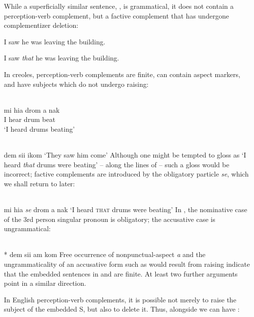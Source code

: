 \z

\z

\z
While a superficially similar sentence, , is grammatical, it does not contain a perception-verb complement, but a factive complement that has undergone complementizer deletion:

\ea\label{ex:2:130}I saw he was leaving the building.\z

\ea\label{ex:2:131}I saw \textit{that} he was leaving the building.\z

In creoles, perception-verb complements are finite, can contain aspect markers, and have subjects which do not undergo raising:

\ea\label{ex:2:132}
\langinfo{\langGC}{}{}\\
\gll mi hia drom a nak\\
I hear drum {\ASP} beat\\
\glt `I heard drums beating'
\z

\ea\label{ex:2:133}
\langinfo{\langGC}{}{}\\
dem sii ikom
\glt `They saw him come'
\z
Although one might be tempted to gloss  as `I heard \textit{that} drums were beating' -- along the lines of  -- such a gloss would be incorrect; factive complements are introduced by the obligatory particle \textit{se}, which we shall return to later:

\ea\label{ex:2:134}
\langinfo{\langGC}{}{}\\
mi hia \textit{se} drom a nak
\glt `I heard {\scshape that} drums were beating'
\z
In , the nominative case of the 3rd person singular pronoun is obligatory; the accusative case is ungrammatical:

\ea\label{ex:2:135}
\langinfo{\langGC}{}{}\\
\textnormal{*} dem sii am kom
\z
Free occurrence of nonpunctual-aspect \textit{a} and the ungrammaticality of an accusative form such as would result from raising indicate that the embedded sentences in  and  are finite. At least two further arguments point in a similar direction.

In English perception-verb complements, it is possible not merely to raise the subject of the embedded S, but also to delete it. Thus, alongside  we can have :

